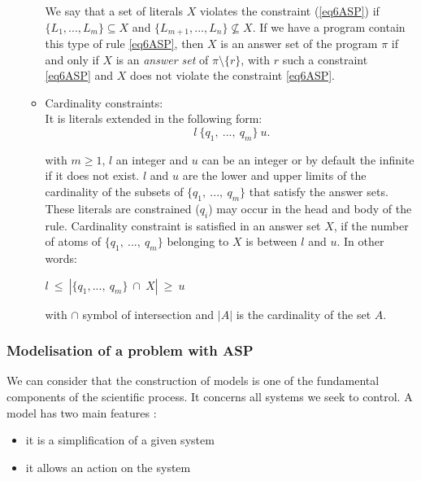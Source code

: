 \begin{enumerate}
\begin{itemize}
We say that a set of literals $X$ violates the constraint (\ref{eq6ASP}) if $\{L_{1},...,L_{m}\} \subseteq X$ and $\{L_{m+1},...,L_{n}\} \nsubseteq X$. If we have a program contain this type of rule \ref{eq6ASP}, then $X$ is an answer set of the program $\pi$ if and only if $X$ is an \textit{answer set} of $\pi \setminus \{r\}$, with $r$ such a constraint \ref{eq6ASP} and $X$ does not violate the constraint \ref{eq6ASP}.

\item Cardinality constraints:\\
It is literals extended in the following form:
\begin{equation} 
 ~ l ~\{q_{1},~ ... ,~ q_{m}\}~ u.
 \label{eq7ASP}
\end{equation}

with $m \geq 1$, $l$ an integer and $u$ can be an integer or by default the infinite if it does not exist. $l$ and $u$ are the lower and upper limits of the cardinality of the subsets of $ \{q_{1},~ ... ,~ q_{m}\}$ that satisfy the answer sets.
These literals are constrained ($q_{i}$) may occur in the head and body of the rule. Cardinality constraint is satisfied in an answer set $ X $, if the number of atoms of $ \{q_{1},~ ... ,~ q_{m}\}$ belonging to $X$ is between $l$ and $u$. In other words:

\begin{tabbing}
 $l~ \leq ~ | \{q_{1},... ,~ q_{m}\} ~ \cap ~ X | ~ \geq ~u$
\end{tabbing}

with $ \cap $ symbol of intersection and $ | A | $ is the cardinality of the set $ A $.


\end{itemize}

\end{enumerate}



\subsubsection{Modelisation of a problem with ASP}

We can consider that the construction of models is one of the fundamental components of the scientific process. It concerns all systems we seek to control. A model has two main features \cite{Glimpse}:
\begin{itemize}
\item it is a simplification of a given system
\item it allows an action on the system  
\end{itemize}


